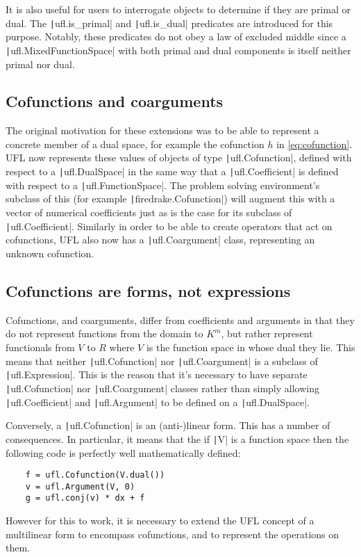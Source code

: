 \documentclass[a4paper,11pt]{article}
\begin{document}
It is also useful for users to interrogate objects to determine if they are primal or dual. The \texttt|ufl.is_primal| and \texttt|ufl.is_dual| predicates are introduced for this purpose. Notably, these predicates do not obey a law of excluded middle since a \texttt|ufl.MixedFunctionSpace| with both primal and dual components is itself neither primal nor dual.

\subsection{Cofunctions and coarguments}

The original motivation for these extensions was to be able to represent a concrete member of a dual space, for example the cofunction $h$ in \eqref{eq:cofunction}. UFL now represents these values of objects of type \texttt|ufl.Cofunction|, defined with respect to a \texttt|ufl.DualSpace| in the same way that a \texttt|ufl.Coefficient| is defined with respect to a \texttt|ufl.FunctionSpace|. The problem solving environment's subclass of this (for example \texttt|firedrake.Cofunction|) will augment this with a vector of numerical coefficients just as is the case for its subclass of \texttt|ufl.Coefficient|. Similarly in order to be able to create operators that act on cofunctions, UFL also now has a \texttt|ufl.Coargument| class, representing an unknown cofunction.

\subsection{Cofunctions are forms, not expressions}

Cofunctions, and coarguments, differ from coefficients and arguments in that they do not represent functions from the domain to $K^m$, but rather represent functionals from $V$ to $R$ where $V$ is the function space in whose dual they lie. This means that neither \texttt|ufl.Cofunction| nor \texttt|ufl.Coargument| is a subclass of \texttt|ufl.Expression|. This is the reason that it's necessary to have separate \texttt|ufl.Cofunction| nor \texttt|ufl.Coargument| classes rather than simply allowing \texttt|ufl.Coefficient| and \texttt|ufl.Argument| to be defined on a \texttt|ufl.DualSpace|.

Conversely, a \texttt|ufl.Cofunction| is an (anti-)linear form. This has a number of consequences. In particular, it means that the if \texttt|V| is a function space then the following code is perfectly well mathematically defined:
\begin{verbatim}
    f = ufl.Cofunction(V.dual())
    v = ufl.Argument(V, 0)
    g = ufl.conj(v) * dx + f
\end{verbatim}
However for this to work, it is necessary to extend the UFL concept of a multilinear form to encompass cofunctions, and to represent the operations on them.
\end{document}
